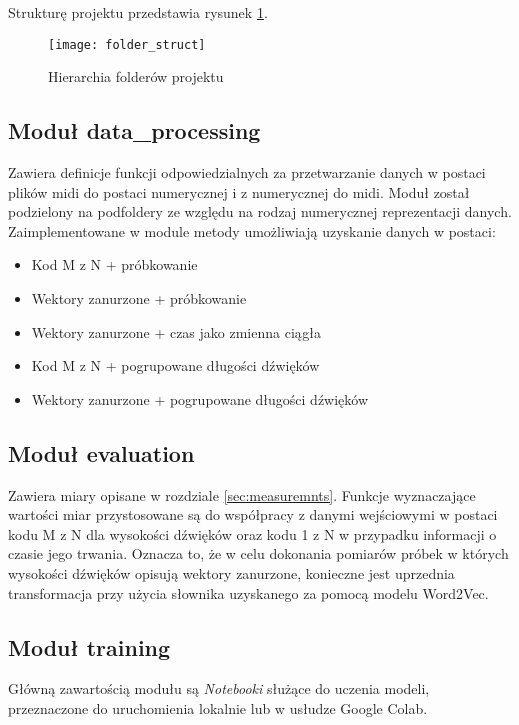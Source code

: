 {{        Strukturę projektu przedstawia rysunek \ref{folder_struct}.

        \begin{figure}
            \centering
            \texttt{[image: folder\_struct]}
            \caption{Hierarchia folderów projektu}
            \label{folder_struct}
        \end{figure}

        \subsection{Moduł data\_processing}
        {
            Zawiera definicje funkcji odpowiedzialnych za przetwarzanie danych w postaci plików midi do postaci numerycznej i z numerycznej do midi. Moduł został podzielony na podfoldery ze względu na rodzaj numerycznej reprezentacji danych. Zaimplementowane w module metody umożliwiają uzyskanie danych w postaci:
            \begin{itemize}
                \setlength\itemsep{-0.5em}
                \item Kod  M\,\,z\,\,N + próbkowanie
                \item Wektory zanurzone + próbkowanie
                \item Wektory zanurzone + czas jako zmienna ciągła
                \item Kod  M\,\,z\,\,N + pogrupowane długości dźwięków
                \item Wektory zanurzone + pogrupowane długości dźwięków
            \end{itemize}


        }

        \subsection{Moduł evaluation}
        {
            Zawiera miary opisane w rozdziale \ref{sec:measuremnts}. Funkcje wyznaczające wartości miar przystosowane są do współpracy z danymi wejściowymi w postaci kodu M\,\,z\,\,N dla wysokości dźwięków oraz kodu 1\,\,z\,\,N w przypadku informacji o czasie jego trwania. Oznacza to, że w celu dokonania pomiarów próbek w których wysokości dźwięków opisują wektory zanurzone, konieczne jest uprzednia transformacja przy użycia słownika uzyskanego za pomocą modelu Word2Vec.
        }

        \subsection{Moduł training}
        {
            Główną zawartością modułu są {\textit {Notebooki}} służące do uczenia modeli, przeznaczone do uruchomienia lokalnie lub w usłudze Google Colab. 
        }

}}
